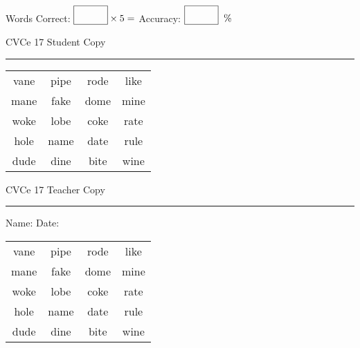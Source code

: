 \documentclass{memoir}
\begin{document}
\small

Words Correct: $\fbox{\phantom{\huge 100}} \times 5 = $ Accuracy: $\fbox{\phantom{\huge 100}}\;\; \%$ 

\vfill

\newpage


\footnotesize \noindent
CVCe 17 \hfill Student Copy
\smallskip
\hrule

\Large

\setlength{\tabcolsep}{14pt}
\def\arraystretch{2}

{\selectfont


\begin{vplace}[0.5]
\begin{center}
\begin{tabular}{cccc}
vane & pipe & rode & like \\
mane & fake & dome & mine \\
woke & lobe & coke & rate \\
hole & name & date & rule \\
dude & dine & bite & wine \\
\end{tabular}
\end{center}
\end{vplace}

}

\newpage

\footnotesize \noindent
CVCe 17 \hfill Teacher Copy
\smallskip
\hrule

\small

\vfill

\noindent
Name: \underline{\hspace{1.75in}} \hfill Date: \underline{\hspace{1in}}

\Large

{\selectfont


\begin{vplace}[0.5]
\begin{center}
\begin{tabular}{cccc}
vane & pipe & rode & like \\
mane & fake & dome & mine \\
woke & lobe & coke & rate \\
hole & name & date & rule \\
dude & dine & bite & wine \\
\end{tabular}
\end{center}
\end{vplace}



}
\end{document}
